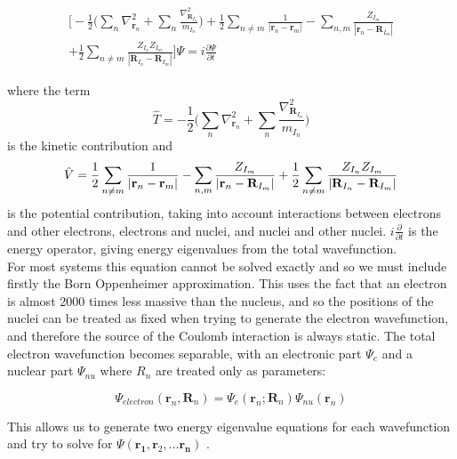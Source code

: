 \documentclass[10pt]{article}
\begin{document}
\begin{gather*}
	\biggr[-\frac{1}{2}\biggr(\sum_n\nabla^2_{\textbf{r}_n}+\sum_{n}\frac{\nabla^2_{\textbf{R}_{I_n}}}{m_{I_n}}\biggr)+\frac{1}{2}\sum_{n\not=m}\frac{1}{|\textbf{r}_n-\textbf{r}_m|}-\sum_{n,m}\frac{Z_{I_m}}{|\textbf{r}_n - \textbf{R}_{I_m}|}\\
	+\frac{1}{2}\sum_{n\not=m}\frac{Z_{I_n}Z_{I_m}}{|\textbf{R}_{I_n}-\textbf{R}_{I_m}|}\biggr]\Psi = i\frac{\partial\Psi}{\partial t}
\end{gather*}

where the term $$\hat{T} = -\frac{1}{2}\biggr(\sum_n\nabla^2_{\textbf{r}_n}+\sum_{n}\frac{\nabla^2_{\textbf{R}_{I_n}}}{m_{I_n}}\biggr)$$ is the kinetic contribution and $$\hat{V}=\frac{1}{2}\sum_{n\not=m}\frac{1}{|\textbf{r}_n-\textbf{r}_m|}-\sum_{n,m}\frac{Z_{I_m}}{|\textbf{r}_n - \textbf{R}_{I_m}|}\\
+\frac{1}{2}\sum_{n\not=m}\frac{Z_{I_n}Z_{I_m}}{|\textbf{R}_{I_n}-\textbf{R}_{I_m}|}$$ is the potential contribution, taking into account interactions between electrons and other electrons, electrons and nuclei, and nuclei and other nuclei.  $i\frac{\partial}{\partial t}$ is the energy operator, giving energy eigenvalues from the total wavefunction.\\

For most systems this equation cannot be solved exactly and so we must include firstly the Born Oppenheimer approximation. This uses the fact that an electron is almost 2000 times less massive than the nucleus, and so the positions of the nuclei can be treated as fixed when trying to generate the electron wavefunction, and therefore the source of the Coulomb interaction is always static. The total electron wavefunction becomes separable, with an electronic part $\Psi_e$ and a nuclear part $\Psi_{nu}$ where $R_n$ are treated only as parameters:

\begin{equation*}
	\Psi_{electron}(\textbf{r}_n,\textbf{R}_n) =  \Psi_e(\textbf{r}_n;\textbf{R}_n)\Psi_{nu}(\textbf{r}_{n})
\end{equation*}

This allows us to generate two energy eigenvalue equations for each wavefunction and try to solve for $\Psi(\mathbf{r_1},\mathbf{r}_2,...\mathbf{r_n})$ \cite{rebolini2014range}. 
\end{document}
